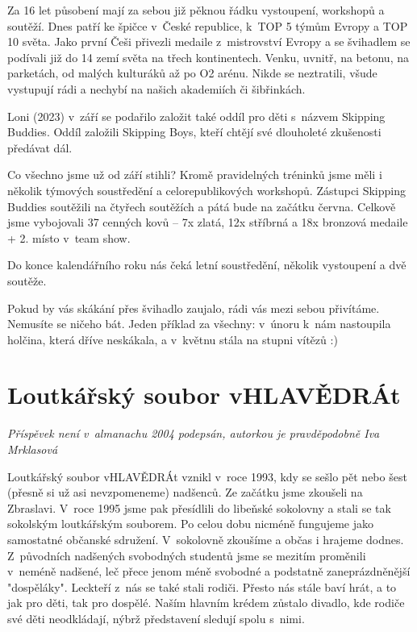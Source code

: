 \documentclass[a5paper, 11pt, twoside]{article}
\begin{document}
Za 16 let působení mají za sebou již pěknou řádku vystoupení, workshopů
a soutěží. Dnes patří ke špičce v~České republice, k~TOP 5 týmům Evropy
a TOP 10 světa. Jako první Češi přivezli medaile z~mistrovství Evropy a
se švihadlem se podívali již do 14 zemí světa na třech kontinentech.
Venku, uvnitř, na betonu, na parketách, od malých kulturáků až po O2
arénu. Nikde se neztratili, všude vystupují rádi a nechybí na našich
akademiích či šibřinkách.

Loni (2023) v~září se podařilo založit také oddíl pro děti s~názvem
Skipping Buddies. Oddíl založili Skipping Boys, kteří chtějí své
dlouholeté zkušenosti předávat dál.

Co všechno jsme už od září stihli? Kromě pravidelných tréninků jsme měli
i několik týmových soustředění a celorepublikových workshopů. Zástupci
Skipping Buddies soutěžili na čtyřech soutěžích a pátá bude na začátku
června. Celkově jsme vybojovali 37 cenných kovů -- 7x zlatá, 12x
stříbrná a 18x bronzová medaile + 2. místo v~team show.

Do konce kalendářního roku nás čeká letní soustředění, několik
vystoupení a dvě soutěže.

Pokud by vás skákání přes švihadlo zaujalo, rádi vás mezi sebou
přivítáme. Nemusíte se ničeho bát. Jeden příklad za všechny: v~únoru
k~nám nastoupila holčina, která dříve neskákala, a v~květnu stála na
stupni vítězů :)

\section{Loutkářský soubor
vHLAVĚDRÁt}

\textit{Příspěvek není v~almanachu 2004 podepsán, autorkou je
pravděpodobně Iva Mrklasová}

Loutkářský soubor vHLAVĚDRÁt vznikl v~roce 1993, kdy se sešlo pět nebo
šest (přesně si už asi nevzpomeneme) nadšenců. Ze začátku jsme zkoušeli
na Zbraslavi. V~roce 1995 jsme pak přesídlili do libeňské sokolovny a
stali se tak sokolským loutkářským souborem. Po celou dobu nicméně
fungujeme jako samostatné občanské sdružení. V~sokolovně zkoušíme a
občas i hrajeme dodnes. Z~původních nadšených svobodných studentů jsme
se mezitím proměnili v~neméně nadšené, leč přece jenom méně svobodné a
podstatně zaneprázdněnější "dospěláky". Leckteří z~nás se také stali
rodiči. Přesto nás stále baví hrát, a to jak pro děti, tak pro dospělé.
Naším hlavním krédem zůstalo divadlo, kde rodiče své děti neodkládají,
nýbrž představení sledují spolu s~nimi.
\end{document}
